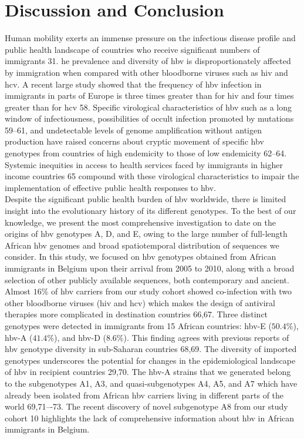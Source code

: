 \section{Discussion and Conclusion}
Human mobility exerts an immense pressure on the infectious disease profile and public health landscape of countries who receive significant numbers of immigrants 31.
he prevalence and diversity of \gls{hbv} is disproportionately affected by immigration when compared with other bloodborne viruses such as \gls{hiv} and \gls{hcv}.
A recent large study showed that the frequency of \gls{hbv} infection in immigrants in parts of Europe is three times greater than for \gls{hiv} and four times greater than for \gls{hcv} 58.
Specific virological characteristics of \gls{hbv} such as a long window of infectiousness, possibilities of occult infection promoted by mutations 59–61, and undetectable levels of genome amplification without antigen production have raised concerns about cryptic movement of specific \gls{hbv} genotypes from countries of high endemicity to those of low endemicity 62–64.
Systemic inequities in access to health services faced by immigrants in higher income countries 65 compound with these virological characteristics to impair the implementation of effective public health responses to \gls{hbv}.\\

Despite the significant public health burden of \gls{hbv} worldwide, there is limited insight into the evolutionary history of its different genotypes.
To the best of our knowledge, we present the most comprehensive investigation to date on the origins of \gls{hbv} genotypes A, D, and E, owing to the large number of full-length African \gls{hbv} genomes and broad spatiotemporal distribution of sequences we consider.
In this study, we focused on \gls{hbv} genotypes obtained  from African immigrants in Belgium upon their arrival from 2005 to 2010, along with  a broad selection of other publicly available sequences, both contemporary and ancient.
Almost $16\%$ of \gls{hbv} carriers from our study cohort showed co-infection with two other bloodborne viruses (\gls{hiv} and \gls{hcv}) which makes the design of antiviral therapies more complicated in destination countries 66,67.
Three distinct genotypes were detected in immigrants from 15 African countries: \gls{hbv}-E ($50.4\%$), \gls{hbv}-A ($41.4\%$), and \gls{hbv}-D ($8.6\%$).
This finding agrees with previous reports of \gls{hbv} genotype diversity in sub-Saharan countries 68,69.
The diversity of imported genotypes underscores the potential for changes in the epidemiological landscape of \gls{hbv} in recipient countries 29,70.
The \gls{hbv}-A strains that we generated belong to the subgenotypes A1, A3, and quasi-subgenotypes A4, A5, and A7 which have already been isolated from African \gls{hbv} carriers living in different parts of the world 69,71–-73.
The recent discovery of novel subgenotype A8 from our study cohort 10 highlights the lack of comprehensive information about \gls{hbv} in African immigrants in Belgium.\\

